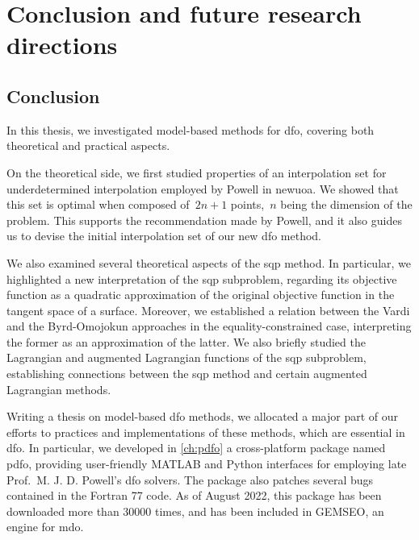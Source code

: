 %
%
%
\chapter{Conclusion and future research directions}
\label{ch:conclusion}

\section{Conclusion}

In this thesis, we investigated model-based methods for \gls{dfo}, covering both theoretical and practical aspects.

On the theoretical side, we first studied properties of an interpolation set for underdetermined interpolation employed by Powell in \gls{newuoa}.
We showed that this set is optimal when composed of~$2n + 1$ points,~$n$ being the dimension of the problem.
This supports the recommendation made by Powell, and it also guides us to devise the initial interpolation set of our new \gls{dfo} method.

We also examined several theoretical aspects of the \gls{sqp} method.
In particular, we highlighted a new interpretation of the \gls{sqp} subproblem, regarding its objective function as a quadratic approximation of the original objective function in the tangent space of a surface.
Moreover, we established a relation between the Vardi and the Byrd-Omojokun approaches in the equality-constrained case, interpreting the former as an approximation of the latter.
We also briefly studied the Lagrangian and augmented Lagrangian functions of the \gls{sqp} subproblem, establishing connections between the \gls{sqp} method and certain augmented Lagrangian methods.

Writing a thesis on model-based \gls{dfo} methods, we allocated a major part of our efforts to practices and implementations of these methods, which are essential in \gls{dfo}.
In particular, we developed in \cref{ch:pdfo} a cross-platform package named \gls{pdfo}, providing user-friendly MATLAB and Python interfaces for employing late Prof.\ M. J. D. Powell's \gls{dfo} solvers.
The package also patches several bugs contained in the Fortran 77 code.
As of August 2022, this package has been downloaded more than \num{30000} times, and has been included in GEMSEO, an engine for \gls{mdo}.

